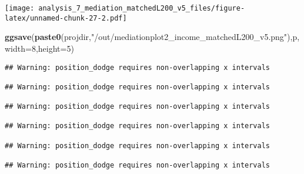 \documentclass[
]{article}
\newenvironment{Shaded}{\begin{snugshade}}{\end{snugshade}}
\newcommand{\DataTypeTok}[1]{\textcolor[rgb]{0.13,0.29,0.53}{#1}}
\newcommand{\DecValTok}[1]{\textcolor[rgb]{0.00,0.00,0.81}{#1}}
\newcommand{\KeywordTok}[1]{\textcolor[rgb]{0.13,0.29,0.53}{\textbf{#1}}}
\newcommand{\NormalTok}[1]{#1}
\newcommand{\StringTok}[1]{\textcolor[rgb]{0.31,0.60,0.02}{#1}}
\begin{document}
\texttt{[image: analysis\_7\_mediation\_matchedL200\_v5\_files/figure-latex/unnamed-chunk-27-2.pdf]}

\begin{Shaded}
\begin{Highlighting}[]
\KeywordTok{ggsave}\NormalTok{(}\KeywordTok{paste0}\NormalTok{(projdir,}\StringTok{"/out/mediationplot2_income_matchedL200_v5.png"}\NormalTok{),p,}\DataTypeTok{width=}\DecValTok{8}\NormalTok{,}\DataTypeTok{height=}\DecValTok{5}\NormalTok{)}
\end{Highlighting}
\end{Shaded}

\begin{verbatim}
## Warning: position_dodge requires non-overlapping x intervals

## Warning: position_dodge requires non-overlapping x intervals

## Warning: position_dodge requires non-overlapping x intervals

## Warning: position_dodge requires non-overlapping x intervals

## Warning: position_dodge requires non-overlapping x intervals

## Warning: position_dodge requires non-overlapping x intervals
\end{verbatim}
\end{document}
